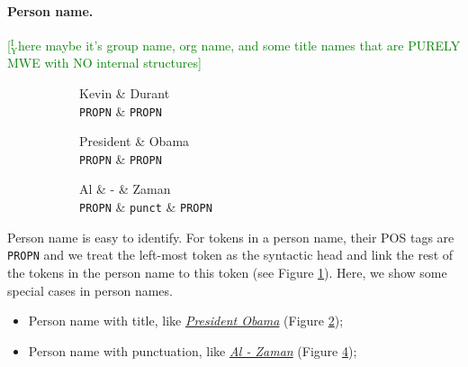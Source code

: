 \documentclass[11pt,a4paper]{article}
\newcommand{\yicomment}[1]{\textcolor{green}{[$_\mathrm{Y}^\mathrm{I}$#1]}}
\begin{document}
\paragraph{Person name.} \yicomment{here maybe it's group name, org name, and some title names that are PURELY MWE with NO internal structures}
\begin{figure}[t]
	\begin{subfigure}[t]{0.3\columnwidth}
		\centering
		\small
		\begin{dependency}[edge slant=2, text only label, label style=above]
			\begin{deptext}
				Kevin \& Durant \\
				\texttt{PROPN} \& \texttt{PROPN} \\
			\end{deptext}
		\end{dependency}
	\caption{}\label{fig:per-name:vanilla}
	\end{subfigure}
	\begin{subfigure}[t]{0.3\columnwidth}
		\centering
		\small
		\begin{dependency}[edge slant=2, text only label, label style=above]
			\begin{deptext}
				President \& Obama \\
				\texttt{PROPN} \& \texttt{PROPN} \\
			\end{deptext}
		\end{dependency}
	\caption{}\label{fig:per-name:title}
	\end{subfigure}
	\begin{subfigure}[t]{0.3\columnwidth}
		\centering
		\small
		\begin{dependency}[edge slant=2, text only label, label style=above]
			\begin{deptext}
				Al \& - \& Zaman \\
				\texttt{PROPN} \& \texttt{punct} \& \texttt{PROPN} \\
			\end{deptext}
		\end{dependency}
		\caption{}\label{fig:per-name:punct}
	\end{subfigure}
\end{figure}
Person name is easy to identify.
For tokens in a person name, their POS tags are \texttt{PROPN} and
we treat the left-most token as the syntactic head
and link the rest of the tokens in the person name to this token (see Figure \ref{fig:per-name:vanilla}).
Here, we show some special cases in person names.
\begin{itemize}
	\item Person name with title, like \underline{\textit{President Obama}} (Figure \ref{fig:per-name:title});
	\item Person name with punctuation, like \underline{\textit{Al - Zaman}} (Figure \ref{fig:per-name:punct});
\end{itemize}
\end{document}
